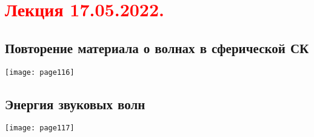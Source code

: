 \documentclass[main.tex]{subfiles}
\begin{document}
\section{\textcolor{red}{Лекция 17.05.2022.}}

\subsection{Повторение материала о волнах в сферической СК}
\texttt{[image: page116]}

\subsection{Энергия звуковых волн}
\texttt{[image: page117]}


\end{document}
